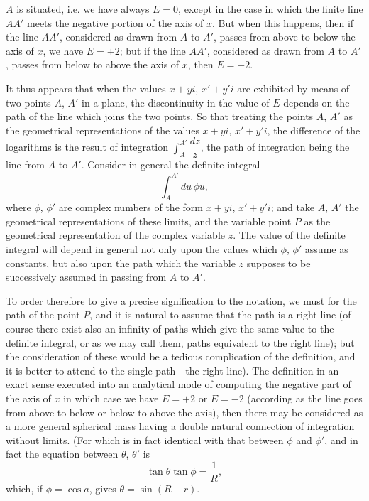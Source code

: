 \documentclass[11pt,a4paper]{book}
\begin{document}
\smallskip

$A$ is situated, i.e. we have always $E = 0$, except in the case in which the finite line
$AA'$ meets the negative portion of the axis of $x$. But when this happens, then if
the line $AA'$, considered as drawn from $A$ to $A'$, passes from above to below the
axis of $x$, we have $E = +2$; but if the line $AA'$, considered as drawn from $A$ to $A'$,
passes from below to above the axis of $x$, then $E = -2$.

\medskip

It thus appears that when the values $x+yi$, $x'+y'i$ are exhibited by means of two
points $A$, $A'$ in a plane, the discontinuity in the value of $E$ depends on the path of
the line which joins the two points. So that treating the points $A$, $A'$ as the geometrical
representations of the values $x+yi$, $x'+y'i$, the difference of the logarithms is
the result of integration $\int_A^{A'}\dfrac{dz}{z}$, the path of integration being the line from $A$ to $A'$.
Consider in general the definite integral
\[
\int_A^{A'} d u \, \phi u,
\]
where $\phi$, $\phi'$ are complex numbers of the form $x+yi$, $x'+y'i$; and take $A$, $A'$ the geometrical
representations of these limits, and the variable point $P$ as the geometrical
representation of the complex variable $z$. The value of the definite integral will
depend in general not only upon the values which $\phi$, $\phi'$ assume as constants, but also
upon the path which the variable $z$ supposes to be successively assumed in passing from
$A$ to $A'$.

\medskip

To order therefore to give a precise signification to the notation, we must for the
path of the point $P$, and it is natural to assume that the path is a right line (of
course there exist also an infinity of paths which give the same value to the definite
integral, or as we may call them, paths equivalent to the right line); but the consideration
of these would be a tedious complication of the definition, and it is better to attend to the
single path---the right line). The definition in an exact sense
executed into an analytical mode of computing the negative part of the axis of $x$ in
which case we have $E = +2$ or $E = -2$ (according as the line goes from above to
below or below to above the axis), then there may be considered as a more general
spherical mass having a double natural connection of integration without limits. (For
which is in fact identical with that between $\phi$ and $\phi'$, and in fact the equation between
$\theta$, $\theta'$ is
\[
\tan\theta\tan\phi = \frac{1}{R},
\]
which, if $\phi = \cos a$, gives $\theta = \sin (R - r)$.
\end{document}
